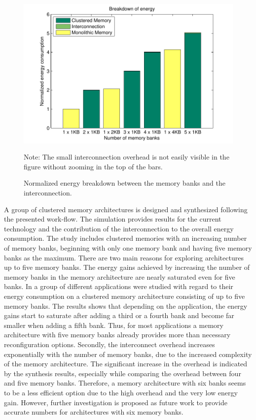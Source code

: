 \begin{figure}
 \centering
 \begin{minipage}{0.9\textwidth} %
 \includegraphics[width =\linewidth]{E/energy2.pdf}
 {\footnotesize Note: The small interconnection overhead is not easily visible in the figure without zooming in the top of the bars.\par}
\end{minipage}
  \caption{Normalized energy breakdown between the memory banks and the interconnection.}
 \label{fig:energyE}
 \end{figure}


A group of clustered memory architectures is designed and synthesized following the presented work-flow.
The simulation provides results for the current technology and the contribution of the interconnection to the overall energy consumption.
The study includes clustered memories with an increasing number of memory banks, beginning with only one memory bank and having five memory banks as the maximum.
There are two main reasons for exploring architectures up to five memory banks.
The energy gains achieved by increasing the number of memory banks in the memory architecture are nearly saturated even for five banks.
In \cite{filippopoulos2013exploration} a group of different applications were studied with regard to their energy consumption on a clustered memory architecture consisting of up to five memory banks.
The results shows that depending on the application, the energy gains start to saturate after adding a third or a fourth bank and become far smaller when adding a fifth bank.
Thus, for most applications a memory architecture with five memory banks already provides more than necessary reconfiguration options.  
Secondly, the interconnect overhead increases exponentially with the number of memory banks, due to the increased complexity of the memory architecture. 
The significant increase in the overhead is indicated by the synthesis results, especially while comparing the overhead between four and five memory banks.
Therefore, a memory architecture with six banks seems to be a less efficient option due to the high overhead and the very low energy gain.
However, further investigation is proposed as future work to provide accurate numbers for architectures with six memory banks.


